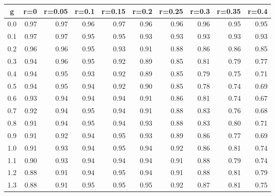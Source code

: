 %
\begin{table}[!tbp]
 \begin{center}
 \begin{tabular}{rrrrrrrrrr}\hline\hline
\multicolumn{1}{c}{g}&\multicolumn{1}{c}{r=0}&\multicolumn{1}{c}{r=0.05}&\multicolumn{1}{c}{r=0.1}&\multicolumn{1}{c}{r=0.15}&\multicolumn{1}{c}{r=0.2}&\multicolumn{1}{c}{r=0.25}&\multicolumn{1}{c}{r=0.3}&\multicolumn{1}{c}{r=0.35}&\multicolumn{1}{c}{r=0.4}\tabularnewline
\hline
0.0&0.97&0.97&0.96&0.97&0.96&0.96&0.96&0.95&0.95\tabularnewline
0.1&0.97&0.97&0.95&0.95&0.93&0.93&0.93&0.93&0.93\tabularnewline
0.2&0.96&0.96&0.95&0.93&0.91&0.88&0.86&0.86&0.85\tabularnewline
0.3&0.94&0.96&0.95&0.92&0.89&0.85&0.81&0.79&0.77\tabularnewline
0.4&0.94&0.95&0.93&0.92&0.89&0.85&0.79&0.75&0.71\tabularnewline
0.5&0.94&0.95&0.94&0.92&0.90&0.85&0.78&0.74&0.69\tabularnewline
0.6&0.93&0.94&0.94&0.94&0.91&0.86&0.81&0.74&0.67\tabularnewline
0.7&0.92&0.94&0.95&0.94&0.91&0.88&0.83&0.76&0.68\tabularnewline
0.8&0.91&0.94&0.95&0.94&0.93&0.88&0.83&0.80&0.71\tabularnewline
0.9&0.91&0.92&0.94&0.95&0.93&0.89&0.86&0.77&0.69\tabularnewline
1.0&0.91&0.93&0.94&0.95&0.94&0.92&0.86&0.81&0.74\tabularnewline
1.1&0.90&0.93&0.94&0.94&0.94&0.91&0.88&0.79&0.74\tabularnewline
1.2&0.88&0.91&0.94&0.95&0.94&0.91&0.88&0.81&0.79\tabularnewline
1.3&0.88&0.91&0.95&0.95&0.95&0.92&0.87&0.81&0.75\tabularnewline
\hline
\end{tabular}

\end{center}

\end{table}

